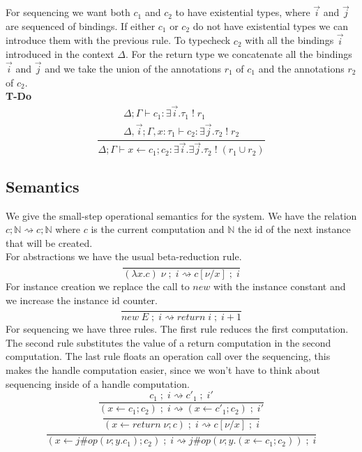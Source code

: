 \documentclass[12pt]{article}
\newcommand\op[0]{op}
\newcommand\ty[0]{\tau}
\newcommand\aty[2]{#1 \; ! \; #2}
\newcommand\texistss[2]{\exists \overrightarrow{#1} . #2}
\newcommand\val[0]{\nu}
\newcommand\vabs[2]{\lambda #1 . #2}
\newcommand\comp[0]{c}
\newcommand\creturn[1]{\textit{return} \; #1}
\newcommand\capp[2]{#1 \; #2}
\newcommand\cdo[3]{#1 \leftarrow #2 ; #3}
\newcommand\copi[5]{#1 \# #2(#3 ; #4 . #5)}
\newcommand\cnew[1]{\textit{new} \; #1}
\newcommand\sep[0]{\;;\;}
\begin{document}
For sequencing we want both $c_1$ and $c_2$ to have existential types, where $\overrightarrow{i}$ and $\overrightarrow{j}$ are sequenced of bindings. If either $c_1$ or $c_2$ do not have existential types we can introduce them with the previous rule.
To typecheck $c_2$ with all the bindings $\overrightarrow{i}$ introduced in the context $\Delta$. For the return type we concatenate all the bindings $\overrightarrow{i}$ and $\overrightarrow{j}$ and we take the union of the annotations $r_1$ of $c_1$ and the annotations $r_2$ of $c_2$. \\
\textbf{T-Do}
\[\frac{
	\begin{array}{l}
	\Delta;\Gamma \vdash c_1 : \texistss{i}{\aty{\ty_1}{r_1}} \\
	\Delta,\overrightarrow{i} ; \Gamma, x : \ty_1 \vdash c_2 : \texistss{j}{\aty{\ty_2}{r_2}}
	\end{array}
}{
	\Delta;\Gamma \vdash \cdo{x}{c_1}{c_2} : \texistss{i}{\texistss{j}{\aty{\ty_2}{(r_1 \cup r_2)}}}
}\]

\subsection{Semantics}
We give the small-step operational semantics for the system.
We have the relation $\comp; \mathbb{N} \rightsquigarrow \comp;\mathbb{N}$ where $\comp$ is the current computation and $\mathbb{N}$ the id of the next instance that will be created. \\
For abstractions we have the usual beta-reduction rule.\\
\[\frac{
}{
	\capp{(\vabs{x}{\comp})}{\val}\sep i \rightsquigarrow \comp[\val/x]\sep i
}\]
For instance creation we replace the call to $new$ with the instance constant and we increase the instance id counter.\\
\[\frac{
}{
	\cnew{E}\sep i \rightsquigarrow \creturn{i}\sep i + 1
}\]
\newpage
For sequencing we have three rules. The first rule reduces the first computation.
The second rule substitutes the value of a return computation in the second computation.
The last rule floats an operation call over the sequencing, this makes the handle computation easier, since we won't have to think about sequencing inside of a handle computation.\\
\[\frac{
	\comp_1\sep i \rightsquigarrow \comp'_1\sep i'
}{
	(\cdo{x}{\comp_1}{\comp_2})\sep i \rightsquigarrow (\cdo{x}{\comp'_1}{\comp_2})\sep i'
}\]
\[\frac{
}{
	(\cdo{x}{\creturn{\val}}{\comp})\sep i \rightsquigarrow \comp[\val/x]\sep i
}\]
\[\frac{
}{
	(\cdo{x}{\copi{j}{\op}{\val}{y}{\comp_1}}{\comp_2})\sep i \rightsquigarrow \copi{j}{\op}{\val}{y}{(\cdo{x}{\comp_1}{\comp_2})}\sep i
}\]
\end{document}
